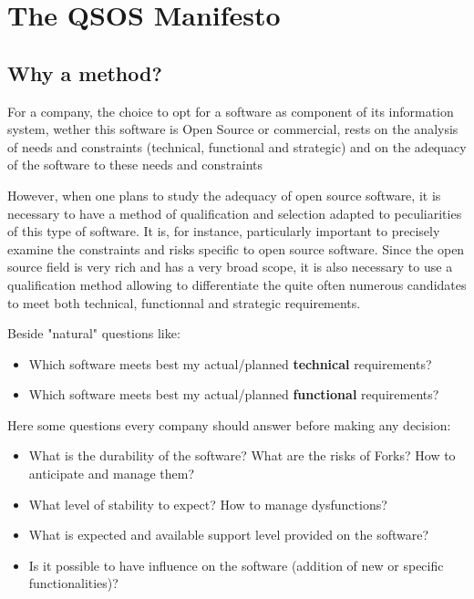 %
\section{The QSOS Manifesto}

\subsection{Why a method?}
For a company, the choice to opt for a software as component of its information
system, wether this software is Open Source or commercial, rests on the
analysis of needs and constraints (technical, functional and strategic) and on the adequacy 
of the software to these needs and constraints 

However, when one plans to study the adequacy of open source software, it is necessary to have 
a method of qualification and selection adapted to peculiarities of this type of software. 
It is, for instance, particularly important to precisely examine the constraints and risks 
specific to open source software. 
Since the open source field is very rich and has a very broad scope, it is also 
necessary to use a qualification method allowing to
differentiate the quite often numerous candidates to meet both technical, functionnal and strategic requirements.

Beside "natural" questions like:
\begin{itemize}
\item Which software meets best my actual/planned {\bf technical} requirements?
\item Which software meets best my actual/planned {\bf functional} requirements?
\end{itemize}

Here some questions every company should answer before making any decision:
\begin{itemize}
\item What is the durability of the software? What are the risks of Forks? How to anticipate and manage them?
\item What level of stability to expect? How to manage dysfunctions?
\item What is expected and available support level provided on the software?
\item Is it possible to have influence on the software (addition of new or specific functionalities)?
\end{itemize}



